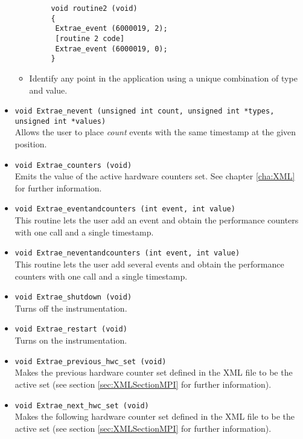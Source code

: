 \begin{itemize}
\begin{itemize}
\begin{verbatim}
     void routine2 (void)
     {
      Extrae_event (6000019, 2);
      [routine 2 code]
      Extrae_event (6000019, 0);
     }
   \end{verbatim}
   \item Identify any point in the application using a unique combination of type and value.
  \end{itemize}

 \item {\tt void Extrae\_nevent (unsigned int count, unsigned int *types, unsigned int *values)}\\
  Allows the user to place {\em count} events with the same timestamp at the given position.

 \item {\tt void Extrae\_counters (void)}\\
  Emits the value of the active hardware counters set. See chapter \ref{cha:XML} for further information.

 \item {\tt void Extrae\_eventandcounters (int event, int value)}\\
  This routine lets the user add an event and obtain the performance counters with one call and a single timestamp.

 \item {\tt void Extrae\_neventandcounters (int event, int value)}\\
  This routine lets the user add several events and obtain the performance counters with one call and a single timestamp.

 \item {\tt void Extrae\_shutdown (void)}\\
  Turns off the instrumentation.

 \item {\tt void Extrae\_restart (void)}\\
  Turns on the instrumentation.

 \item {\tt void Extrae\_previous\_hwc\_set (void)}\\
  Makes the previous hardware counter set defined in the XML file to be the active set (see section \ref{sec:XMLSectionMPI} for further information).

 \item {\tt void Extrae\_next\_hwc\_set (void)}\\
  Makes the following hardware counter set defined in the XML file to be the active set (see section \ref{sec:XMLSectionMPI} for further information).


\end{itemize}
